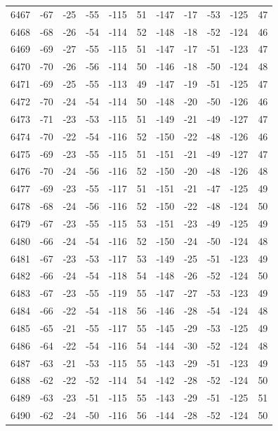 \begin{table}[H]
\begin{tabular}{lllllllllll}
6467 & -67 & -25 & -55 & -115 & 51 & -147 & -17 & -53 & -125 & 47 \\
6468 & -68 & -26 & -54 & -114 & 52 & -148 & -18 & -52 & -124 & 46 \\
6469 & -69 & -27 & -55 & -115 & 51 & -147 & -17 & -51 & -123 & 47 \\
6470 & -70 & -26 & -56 & -114 & 50 & -146 & -18 & -50 & -124 & 48 \\
6471 & -69 & -25 & -55 & -113 & 49 & -147 & -19 & -51 & -125 & 47 \\
6472 & -70 & -24 & -54 & -114 & 50 & -148 & -20 & -50 & -126 & 46 \\
6473 & -71 & -23 & -53 & -115 & 51 & -149 & -21 & -49 & -127 & 47 \\
6474 & -70 & -22 & -54 & -116 & 52 & -150 & -22 & -48 & -126 & 46 \\
6475 & -69 & -23 & -55 & -115 & 51 & -151 & -21 & -49 & -127 & 47 \\
6476 & -70 & -24 & -56 & -116 & 52 & -150 & -20 & -48 & -126 & 48 \\
6477 & -69 & -23 & -55 & -117 & 51 & -151 & -21 & -47 & -125 & 49 \\
6478 & -68 & -24 & -56 & -116 & 52 & -150 & -22 & -48 & -124 & 50 \\
6479 & -67 & -23 & -55 & -115 & 53 & -151 & -23 & -49 & -125 & 49 \\
6480 & -66 & -24 & -54 & -116 & 52 & -150 & -24 & -50 & -124 & 48 \\
6481 & -67 & -23 & -53 & -117 & 53 & -149 & -25 & -51 & -123 & 49 \\
6482 & -66 & -24 & -54 & -118 & 54 & -148 & -26 & -52 & -124 & 50 \\
6483 & -67 & -23 & -55 & -119 & 55 & -147 & -27 & -53 & -123 & 49 \\
6484 & -66 & -22 & -54 & -118 & 56 & -146 & -28 & -54 & -124 & 48 \\
6485 & -65 & -21 & -55 & -117 & 55 & -145 & -29 & -53 & -125 & 49 \\
6486 & -64 & -22 & -54 & -116 & 54 & -144 & -30 & -52 & -124 & 48 \\
6487 & -63 & -21 & -53 & -115 & 55 & -143 & -29 & -51 & -123 & 49 \\
6488 & -62 & -22 & -52 & -114 & 54 & -142 & -28 & -52 & -124 & 50 \\
6489 & -63 & -23 & -51 & -115 & 55 & -143 & -29 & -51 & -125 & 51 \\
6490 & -62 & -24 & -50 & -116 & 56 & -144 & -28 & -52 & -124 & 50 \\

\end{tabular}
\end{table}
